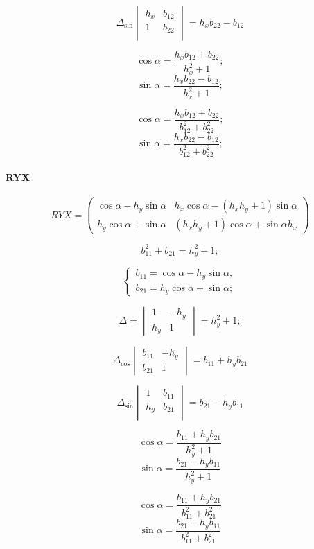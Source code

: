 $$\Delta_{\sin}\begin{vmatrix}
	h_x & b_{12}\\
	1 & b_{22}\\
\end{vmatrix} = h_x b_{22} - b_{12}$$

$$\cos\alpha = \frac{h_x b_{12} + b_{22}}{h_x^2 + 1};$$
$$\sin\alpha = \frac{h_x b_{22} - b_{12}}{h_x^2 + 1};$$

$$\cos\alpha = \frac{h_x b_{12} + b_{22}}{b_{12}^2 + b_{22}^2};$$
$$\sin\alpha = \frac{h_x b_{22} - b_{12}}{b_{12}^2 + b_{22}^2};$$

\paragraph{RYX}

\[
RYX = 
\begin{pmatrix}
	\cos\alpha - {h_y} \sin\alpha &
	{h_x} \cos\alpha - \left( {h_x} {h_y} + 1\right) \sin\alpha \\
	{h_y} \cos\alpha + \sin\alpha & 
	\left( {h_x} {h_y} + 1\right)\cos\alpha + \sin\alpha {h_x}
\end{pmatrix}
\]

$$b_{11}^2 + b_{21} = h_y^2 + 1;$$

$$\begin{cases}
	b_{11} = \cos\alpha - {h_y} \sin\alpha,\\
	b_{21} = {h_y} \cos\alpha + \sin\alpha;
\end{cases}$$

$$\Delta = \begin{vmatrix}
	1 & -h_y\\
	h_y & 1
\end{vmatrix} = h_y^2 + 1;$$

$$\Delta_{\cos}\begin{vmatrix}
	b_{11} & -h_y\\
	b_{21} & 1
\end{vmatrix} = b_{11} + h_y b_{21}$$

$$\Delta_{\sin}\begin{vmatrix}
	1   & b_{11}\\
	h_y & b_{21}\\
\end{vmatrix} = b_{21} - h_y b_{11}$$


$$\cos\alpha = \frac{b_{11} + h_y b_{21}}{h_y^2 + 1}$$
$$\sin\alpha = \frac{b_{21} - h_y b_{11}}{h_y^2 + 1}$$

$$\cos\alpha = \frac{b_{11} + h_y b_{21}}{b_{11}^2 + b_{21}^2}$$
$$\sin\alpha = \frac{b_{21} - h_y b_{11}}{b_{11}^2 + b_{21}^2}$$


